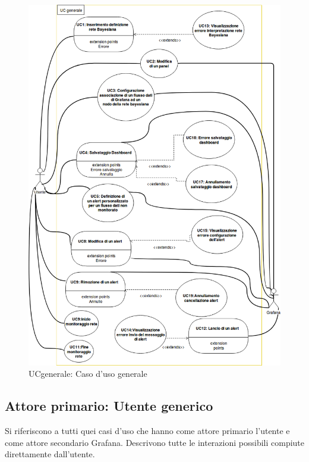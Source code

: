  
        \begin{figure}[!htbp]
                	\centering
                	\includegraphics[width=13cm]{UCgeneral.png}
                	\caption{UCgenerale: Caso d'uso generale}
                \end{figure}  
              \clearpage      
		\subsection{Attore primario: Utente generico}
		Si riferiscono a tutti quei casi d'uso che hanno come attore primario l'utente e come attore secondario Grafana. Descrivono tutte le interazioni possibili compiute direttamente dall'utente.
                    
                        
		
